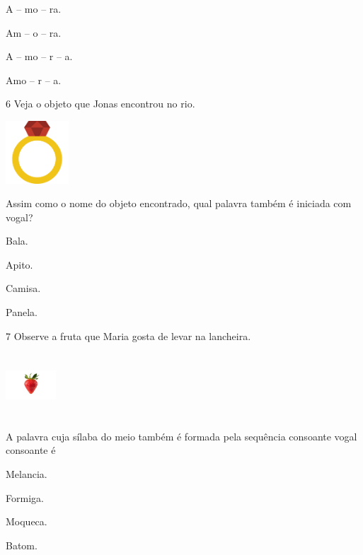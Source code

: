 \begin{escolha}
\item A -- mo -- ra.

\item Am -- o -- ra.

\item A -- mo -- r -- a.

\item Amo -- r -- a.
\end{escolha}

\num{6} Veja o objeto que Jonas encontrou no rio.

\includegraphics[width=0.92222in,height=0.92222in]{media/image151.png}


Assim como o nome do objeto encontrado, qual palavra também é iniciada com vogal?

\begin{escolha}
\item Bala.

\item Apito.

\item Camisa.

\item Panela.
\end{escolha}

\num{7} Observe a fruta que Maria gosta de levar na lancheira.

\includegraphics[width=0.73819in,height=0.93750in]{media/image152.jpeg}


A palavra cuja sílaba do meio também é formada pela sequência consoante vogal consoante é

\begin{escolha}
\item Melancia.

\item Formiga.

\item Moqueca.

\item Batom.
\end{escolha}

